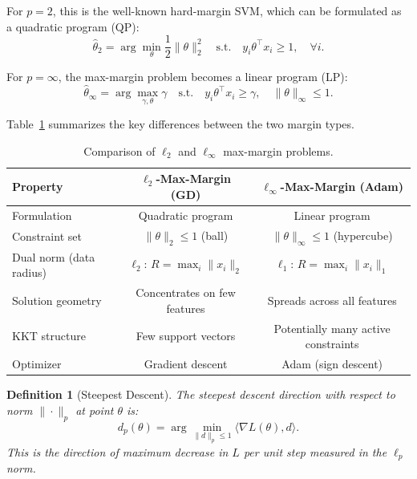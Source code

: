 \documentclass{article}
\newtheorem{definition}[theorem]{Definition}
\begin{document}
For $p = 2$, this is the well-known hard-margin SVM, which can be formulated as a quadratic program (QP):
\begin{equation}
    \hat{\theta}_2 = \arg\min_\theta \frac{1}{2}\|\theta\|_2^2 \quad \text{s.t.} \quad y_i \theta^\top x_i \geq 1, \quad \forall i.
    \label{eq:l2_qp}
\end{equation}

For $p = \infty$, the max-margin problem becomes a linear program (LP):
\begin{equation}
    \hat{\theta}_\infty = \arg\max_{\gamma, \theta} \gamma \quad \text{s.t.} \quad y_i \theta^\top x_i \geq \gamma, \quad \|\theta\|_\infty \leq 1.
    \label{eq:linf_lp}
\end{equation}

Table~\ref{tab:comparison} summarizes the key differences between the two margin types.

\begin{table}[h]
\centering
\caption{Comparison of $\ell_2$ and $\ell_\infty$ max-margin problems.}
\label{tab:comparison}
\begin{tabular}{lcc}
\toprule
Property & $\ell_2$-Max-Margin (GD) & $\ell_\infty$-Max-Margin (Adam) \\
\midrule
Formulation & Quadratic program & Linear program \\
Constraint set & $\|\theta\|_2 \leq 1$ (ball) & $\|\theta\|_\infty \leq 1$ (hypercube) \\
Dual norm (data radius) & $\ell_2$: $R = \max_i\|x_i\|_2$ & $\ell_1$: $R = \max_i\|x_i\|_1$ \\
Solution geometry & Concentrates on few features & Spreads across all features \\
KKT structure & Few support vectors & Potentially many active constraints \\
Optimizer & Gradient descent & Adam (sign descent) \\
\bottomrule
\end{tabular}
\end{table}

\begin{definition}[Steepest Descent]
\label{def:steepest}
The steepest descent direction with respect to norm $\|\cdot\|_p$ at point $\theta$ is:
\begin{equation}
    d_p(\theta) = \arg\min_{\|d\|_p \leq 1} \langle \nabla L(\theta), d \rangle.
    \label{eq:steepest}
\end{equation}
This is the direction of maximum decrease in $L$ per unit step measured in the $\ell_p$ norm.
\end{definition}
\end{document}
